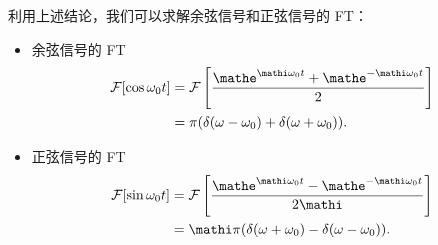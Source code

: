 \begin{example}[余弦信号与正弦信号的 FT]
    利用上述结论，我们可以求解余弦信号和正弦信号的 FT：
    \begin{itemize}
        \item 余弦信号的 FT
            \begin{align*}
                \mathcal{F}[\cos\omega_0t] & = \mathcal{F}\left[\frac{\mathe^{\mathi \omega_0 t} + \mathe^{-\mathi \omega_0 t}}{2}\right] \\
                & = \pi(\delta(\omega - \omega_0) + \delta(\omega + \omega_0)).
            \end{align*}
        \item 正弦信号的 FT
            \begin{align*}
                \mathcal{F}[\sin\omega_0t] & = \mathcal{F}\left[\frac{\mathe^{\mathi \omega_0 t} - \mathe^{-\mathi \omega_0 t}}{2\mathi}\right] \\
                & = \mathi\pi(\delta(\omega + \omega_0) - \delta(\omega - \omega_0)).
            \end{align*}
    \end{itemize}
\end{example}
